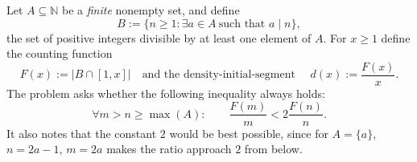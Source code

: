 Let $A\subseteq\mathbb{N}$ be a \emph{finite} nonempty set, and define
\[
B := \{ n\ge 1 : \exists a\in A\ \text{such that } a\mid n\},
\]
the set of positive integers divisible by at least one element of $A$.
For $x\ge 1$ define the counting function
\[F(x):=|B\cap[1,x]|\quad\text{and the density-initial-segment }\quad d(x):=\frac{F(x)}{x}.
\]
The problem asks whether the following inequality always holds:
\[
\forall m>n\ge \max(A):\qquad \frac{F(m)}{m} < 2\frac{F(n)}{n}.
\]
It also notes that the constant $2$ would be best possible, since for $A=\{a\}$, $n=2a-1$, $m=2a$ makes the ratio approach $2$ from below.
